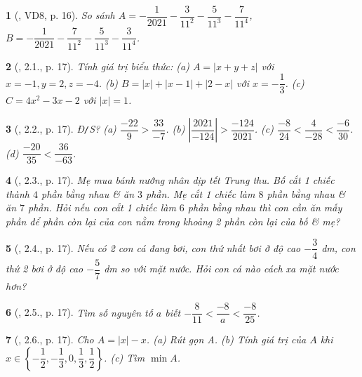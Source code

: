 \documentclass{article}
\newtheorem{baitoan}{}
\begin{document}
\begin{baitoan}[\cite{Binh_boi_duong_Toan_7_tap_1}, VD8, p. 16]
	So sánh $A = -\dfrac{1}{2021} - \dfrac{3}{11^2} - \dfrac{5}{11^3} - \dfrac{7}{11^4}$, $B = -\dfrac{1}{2021} - \dfrac{7}{11^2} - \dfrac{5}{11^3} - \dfrac{3}{11^4}$.
\end{baitoan}

\begin{baitoan}[\cite{Binh_boi_duong_Toan_7_tap_1}, 2.1., p. 17]
	Tính giá trị biểu thức: (a) $A = |x + y + z|$ với $x = -1,y = 2,z = -4$. (b) $B = |x| + |x - 1| + |2 - x|$ với $x = -\dfrac{1}{3}$. (c) $C = 4x^2 - 3x - 2$ với $|x| = 1$.
\end{baitoan}

\begin{baitoan}[\cite{Binh_boi_duong_Toan_7_tap_1}, 2.2., p. 17]
	{\rm Đ{\tt/}S?} (a) $\dfrac{-22}{9} > \dfrac{33}{-7}$. (b) $\left|\dfrac{2021}{-124}\right| > \dfrac{-124}{2021}$. (c) $\dfrac{-8}{24} < \dfrac{4}{-28} < \dfrac{-6}{30}$. (d) $\dfrac{-20}{35} < \dfrac{36}{-63}$.
\end{baitoan}

\begin{baitoan}[\cite{Binh_boi_duong_Toan_7_tap_1}, 2.3., p. 17]
	Mẹ mua bánh nướng nhân dịp tết Trung thu. Bố cắt 1 chiếc thành $4$ phần bằng nhau \& ăn $3$ phần. Mẹ cắt 1 chiếc làm $8$ phần bằng nhau \& ăn $7$ phần. Hỏi nếu con cắt 1 chiếc làm $6$ phần bằng nhau thì con cần ăn mấy phần để phần còn lại của con nằm trong khoảng 2 phần còn lại của bố \& mẹ?
\end{baitoan}

\begin{baitoan}[\cite{Binh_boi_duong_Toan_7_tap_1}, 2.4., p. 17]
	Nếu có 2 con cá đang bơi, con thứ nhất bơi ở độ cao $-\dfrac{3}{4}$ {\rm dm}, con thứ 2 bơi ở độ cao $-\dfrac{5}{7}$ {\rm dm} so với mặt nước. Hỏi con cá nào cách xa mặt nước hơn?
\end{baitoan}

\begin{baitoan}[\cite{Binh_boi_duong_Toan_7_tap_1}, 2.5., p. 17]
	Tìm số nguyên tố $a$ biết $-\dfrac{8}{11} < \dfrac{-8}{a} < \dfrac{-8}{25}$.
\end{baitoan}

\begin{baitoan}[\cite{Binh_boi_duong_Toan_7_tap_1}, 2.6., p. 17]
	Cho $A = |x| - x$. (a) Rút gọn A. (b) Tính giá trị của $A$ khi $x\in\left\{-\dfrac{1}{2},-\dfrac{1}{3},0,\dfrac{1}{3},\dfrac{1}{2}\right\}$. (c) Tìm $\min A$.
\end{baitoan}
\end{document}
